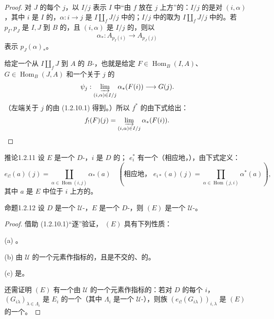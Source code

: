 \begin{proof}
对 $J$ 的每个 $j$，以 $I/j$ 表示 $I$ 中“由 $f$ 放在 $j$ 上方”的：$I/j$ 的是对 $(i,\alpha)$，其中 $i$ 是 $I$ 的，$\alpha:i\to j$ 是 $I\amalg_fJ/j$ 中的；$I/j$ 中的取为 $I\amalg_fJ/j$ 中的。若 $p_I,p_J$ 是 $I,J$ 到 $B$ 的，且 $(i,\alpha)$ 是 $I/j$ 的，则以
\[
\alpha_*:A_{p_I(i)}\longrightarrow A_{p_J(j)}
\]
表示 $p_J(\alpha)_*$。

给定一个从 $I\amalg_fJ$ 到 $A$ 的 $B$-，也就是给定 $F\in\operatorname{Hom}_B(I,A)$、$G\in\operatorname{Hom}_B(J,A)$ 和一个关于 $j$ 的
\[
\psi_j:\varinjlim_{(i,\alpha)\in I/j}\alpha_*(F(i))\longrightarrow G(j).
\]
（左端关于 $j$ 的由 (1.2.10.1) 得到。）所以 $f^*$ 的由下式给出：
\[
f_!(F)(j)=\varinjlim_{(i,\alpha)\in I/j}\alpha_*(F(i)).
\]
\end{proof}

\begin{SGAresult}{推论}{1.2.11}
设 $E$ 是一个 $D$-，$i$ 是 $D$ 的； $e_i^*$ 有一个（相应地，），由下式定义：
\[
e_{i!}(a)(j)=\coprod_{\alpha\in\operatorname{Hom}(i,j)}\alpha_*(a)
\quad\left(\text{相应地， }e_{i*}(a)(j)=\prod_{\alpha\in\operatorname{Hom}(j,i)}\alpha^*(a)\right),
\]
其中 $a$ 是 $E$ 中位于 $i$ 上方的。
\end{SGAresult}

\begin{SGAresult}{命题}{1.2.12}
设 $D$ 是一个 $\mathcal U$-，$E$ 是一个 $D$-，则 $(E)$ 是一个 $\mathcal U$-。
\end{SGAresult}
\begin{proof}
借助 (1.2.10.1)“逐”验证， $(E)$ 具有下列性质：

(a) 。

(b) 由 $\mathcal U$ 的一个元素作指标的，且是不交的、的。

(c) 是。

还需证明 $(E)$ 有一个由 $\mathcal U$ 的一个元素作指标的：若对 $D$ 的每个 $i$，$(G_{i\lambda})_{\lambda\in\Lambda_i}$ 是 $E_i$ 的一个（其中 $\Lambda_i$ 是一个 $\mathcal U$-），则族 $(e_{i!}(G_{i\lambda}))_{i,\lambda}$ 是 $(E)$ 的一个。
\end{proof}

